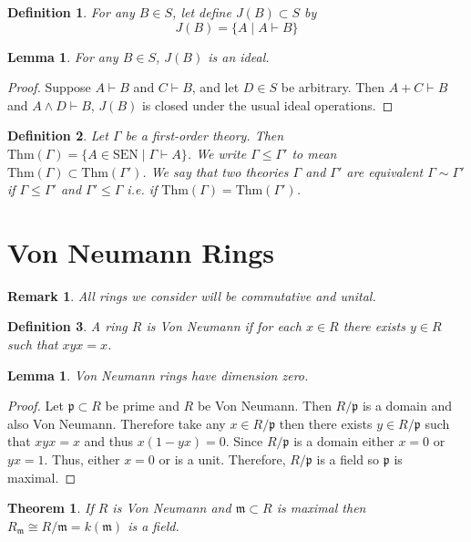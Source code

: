 \documentclass{article}
\newcommand{\proves}{\vdash}
\newcommand{\p}{\mathfrak{p}}
\newcommand{\m}{\mathfrak{m}}
\newcommand{\Thm}[1]{\mathrm{Thm}(#1)}
\newtheorem{lemma}{Lemma}
\newtheorem{thm}{Theorem}
\theoremstyle{plain}
\newtheorem{defn}{Definition}
\newtheorem{rmk}{Remark}
\newtheorem{prop}{Lemma}
\begin{document}
\begin{defn}
For any $B \in S$, let define $J(B) \subset S$ by
\[ J(B) = \{ A \mid A \vdash B \} \]
\end{defn}
\begin{lemma}
For any $B \in S$, $J(B)$ is an ideal.
\end{lemma}
\begin{proof}
Suppose $A \vdash B$ and $C \vdash B$, and let $D \in S$
be arbitrary. Then $A + C \vdash B$ and $A \land D \vdash B$,
$J(B)$ is closed under the usual ideal operations.
\end{proof}


\begin{defn}
Let $\Gamma$ be a first-order theory. Then $\Thm{\Gamma} = \{ A \in \mathrm{SEN} \mid \Gamma \proves A \}$. We write $\Gamma \le \Gamma'$ to mean $\Thm{\Gamma} \subset \Thm{\Gamma'}$. We say that two theories $\Gamma$ and $\Gamma'$ are equivalent $\Gamma \sim \Gamma'$ if $\Gamma \le \Gamma'$ and $\Gamma' \le \Gamma$ i.e. if $\Thm{\Gamma} = \Thm{\Gamma'}$.
\end{defn}

\section{Von Neumann Rings}

\begin{rmk}
All rings we consider will be commutative and unital.
\end{rmk}

\begin{defn}
A ring $R$ is \textit{Von Neumann} if for each $x \in R$ there exists $y \in R$ such that $xyx = x$. 
\end{defn}

\begin{prop}
Von Neumann rings have dimension zero.
\end{prop}

\begin{proof}
Let $\p \subset R$ be prime and $R$ be Von Neumann. Then $R / \p$ is a domain and also Von Neumann. Therefore take any $x \in R / \p$ then there exists $y \in R / \p$ such that $xyx = x$ and thus $x(1 - yx) = 0$. Since $R / \p$ is a domain either $x = 0$ or $yx = 1$. Thus, either $x = 0$ or is a unit. Therefore, $R / \p$ is a field so $\p$ is maximal. 
\end{proof}

\begin{thm}
If $R$ is Von Neumann and $\m \subset R$ is maximal then $R_\m \cong R / \m = k(\m)$ is a field. 
\end{thm}
\end{document}
